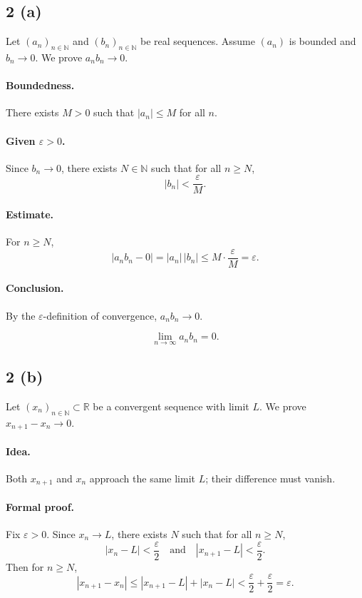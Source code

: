 \documentclass[12pt,a4paper]{article}
\theoremstyle{definition}
\theoremstyle{remark}
\begin{document}
\subsection*{2 (a)}
Let \((a_n)_{n\in\mathbb{N}}\) and \((b_n)_{n\in\mathbb{N}}\) be real sequences. Assume \((a_n)\) is bounded and \(b_n \to 0\). We prove \(a_n b_n \to 0\).

\paragraph{Boundedness.}
There exists \(M>0\) such that \(|a_n| \le M\) for all \(n\).

\paragraph{Given \(\varepsilon>0\).}
Since \(b_n \to 0\), there exists \(N\in\mathbb{N}\) such that for all \(n\ge N\),
\[
|b_n| < \frac{\varepsilon}{M}.
\]

\paragraph{Estimate.}
For \(n\ge N\),
\[
|a_n b_n - 0| = |a_n|\,|b_n| \le M \cdot \frac{\varepsilon}{M} = \varepsilon.
\]

\paragraph{Conclusion.}
By the \(\varepsilon\)-definition of convergence, \(a_n b_n \to 0\).

\[
\boxed{\lim_{n\to\infty} a_n b_n = 0.}
\]

\subsection*{2 (b)}
Let \((x_n)_{n\in\mathbb{N}}\subset \mathbb{R}\) be a convergent sequence with limit \(L\). We prove \(x_{n+1} - x_n \to 0\).

\paragraph{Idea.}
Both \(x_{n+1}\) and \(x_n\) approach the same limit \(L\); their difference must vanish.

\paragraph{Formal proof.}
Fix \(\varepsilon>0\). Since \(x_n \to L\), there exists \(N\) such that for all \(n\ge N\),
\[
|x_n - L| < \frac{\varepsilon}{2}
\quad\text{and}\quad
|x_{n+1} - L| < \frac{\varepsilon}{2}.
\]
Then for \(n\ge N\),
\[
|x_{n+1} - x_n|
\le |x_{n+1} - L| + |x_n - L|
< \frac{\varepsilon}{2} + \frac{\varepsilon}{2} = \varepsilon.
\]
\end{document}
